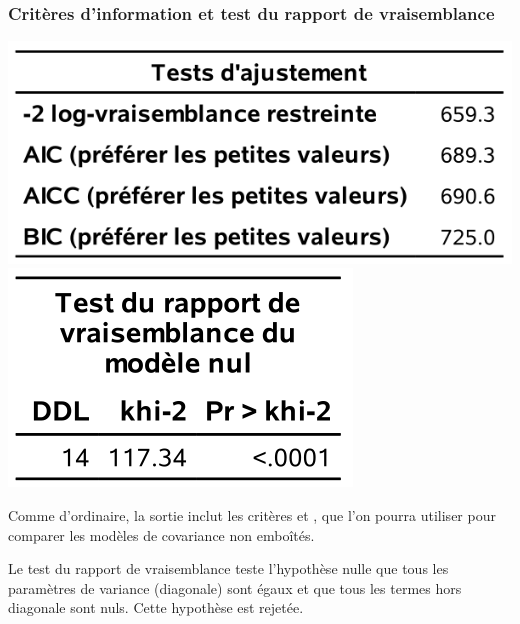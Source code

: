 \documentclass{beamer}
\begin{document}
\begin{frame}
\frametitle{Critères d'information et test du rapport de vraisemblance}

\begin{center}
\includegraphics[width = 0.5\linewidth]{img/c5/diapos6-e23}
\includegraphics[width = 0.3\linewidth]{img/c5/diapos6-e24}

\end{center}
\bi
\item Comme d'ordinaire, la sortie inclut les critères \AIC{} et \BIC{}, que l'on pourra utiliser pour comparer les modèles de covariance non emboîtés.
\item Le test du rapport de vraisemblance teste l'hypothèse nulle que tous les paramètres de variance (diagonale) sont égaux et que tous les termes hors diagonale sont nuls. Cette hypothèse est rejetée.
\ei
\end{frame}
\end{document}
